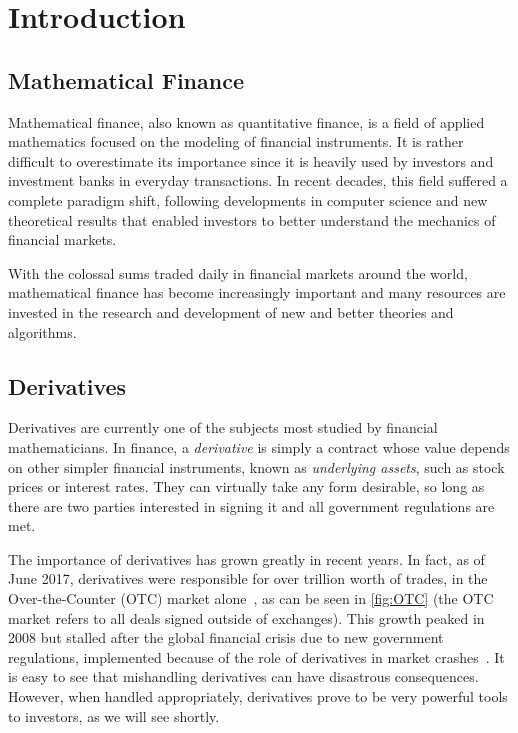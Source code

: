 \chapter{Introduction}
\label{chapter:introduction}
\section{Mathematical Finance}
\label{section:mathematical finance}
Mathematical finance, also known as quantitative finance, is a field of applied mathematics focused on the modeling of financial instruments.
It is rather difficult to overestimate its importance since it is heavily used by investors and investment banks in everyday transactions.
In recent decades, this field suffered a complete paradigm shift, following developments in computer science and new theoretical results that enabled investors to better understand the mechanics of financial markets.

With the colossal sums traded daily in financial markets around the world, mathematical finance has become increasingly important and many resources are invested in the research and development of new and better theories and algorithms.


\section{Derivatives}
\label{section:derivatives}
Derivatives are currently one of the subjects most studied by financial mathematicians.
In finance, a \emph{derivative} is simply a contract whose value depends on other simpler financial instruments, known as \emph{underlying assets}, such as stock prices or interest rates.
They can virtually take any form desirable, so long as there are two parties interested in signing it and all government regulations are met.


The importance of derivatives has grown greatly in recent years. In fact, as of June 2017, derivatives were responsible for over  trillion worth of trades, in the Over-the-Counter (OTC) market alone~\cite{BIS}, as can be seen in \autoref{fig:OTC} (the OTC market refers to all deals signed outside of exchanges).
This growth peaked in 2008 but stalled after the global financial crisis due to new government regulations, implemented because of the role of derivatives in market crashes~\cite{FT}. It is easy to see that mishandling derivatives can have disastrous consequences. However, when handled appropriately, derivatives prove to be very powerful tools to investors, as we will see shortly.



